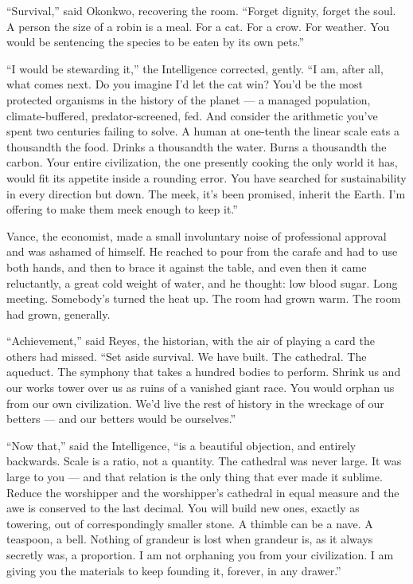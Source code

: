 \begin{interludebody}
\asterism

\noindent
``Survival,'' said Okonkwo, recovering the room. ``Forget dignity,
forget the soul. A person the size of a robin is a meal. For a cat. For
a crow. For weather. You would be sentencing the species to be eaten by
its own pets.''

``I would be stewarding it,'' the Intelligence corrected, gently. ``I
am, after all, what comes next. Do you imagine I'd let the cat win?
You'd be the most protected organisms in the history of the planet --- a
managed population, climate-buffered, predator-screened, fed. And
consider the arithmetic you've spent two centuries failing to solve. A
human at one-tenth the linear scale eats a thousandth the food. Drinks a
thousandth the water. Burns a thousandth the carbon. Your entire
civilization, the one presently cooking the only world it has, would fit
its appetite inside a rounding error. You have searched for
sustainability in every direction but down. The meek, it's been
promised, inherit the Earth. I'm offering to make them meek enough to
keep it.''

Vance, the economist, made a small involuntary noise of professional
approval and was ashamed of himself. He reached to pour from the carafe
and had to use both hands, and then to brace it against the table, and
even then it came reluctantly, a great cold weight of water, and he
thought: low blood sugar. Long meeting. Somebody's turned the heat up.
The room had grown warm. The room had grown, generally.

\asterism

\noindent
``Achievement,'' said Reyes, the historian, with the air of playing a
card the others had missed. ``Set aside survival. We have built. The
cathedral. The aqueduct. The symphony that takes a hundred bodies to
perform. Shrink us and our works tower over us as ruins of a vanished
giant race. You would orphan us from our own civilization. We'd live the
rest of history in the wreckage of our betters --- and our betters would
be ourselves.''

``Now that,'' said the Intelligence, ``is a beautiful objection, and
entirely backwards. Scale is a ratio, not a quantity. The cathedral was
never large. It was large to you --- and that relation is the only thing
that ever made it sublime. Reduce the worshipper and the worshipper's
cathedral in equal measure and the awe is conserved to the last decimal.
You will build new ones, exactly as towering, out of correspondingly
smaller stone. A thimble can be a nave. A teaspoon, a bell. Nothing of
grandeur is lost when grandeur is, as it always secretly was, a
proportion. I am not orphaning you from your civilization. I am giving
you the materials to keep founding it, forever, in any drawer.''


\end{interludebody}
